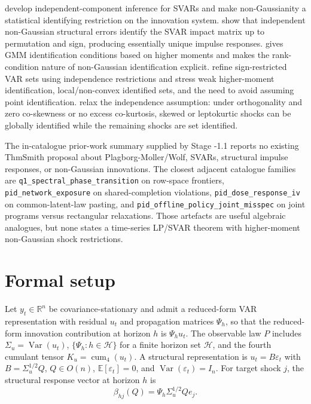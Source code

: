 \documentclass[11pt]{article}
\newcommand{\E}{\mathbb{E}}
\newcommand{\calH}{\mathcal{H}}
\newcommand{\R}{\mathbb{R}}
\theoremstyle{definition}
\theoremstyle{plain}
\theoremstyle{remark}
\begin{document}
\citet{GourierouxMonfortRenne2017} develop independent-component inference for SVARs and make non-Gaussianity a statistical identifying restriction on the innovation system.  \citet{LanneMeitzSaikkonen2017} show that independent non-Gaussian structural errors identify the SVAR impact matrix up to permutation and sign, producing essentially unique impulse responses.  \citet{Guay2021} gives GMM identification conditions based on higher moments and makes the rank-condition nature of non-Gaussian identification explicit.  \citet{DrautzburgWright2023} refine sign-restricted VAR sets using independence restrictions and stress weak higher-moment identification, local/non-convex identified sets, and the need to avoid assuming point identification.  \citet{LanneLiu2026} relax the independence assumption: under orthogonality and zero co-skewness or no excess co-kurtosis, skewed or leptokurtic shocks can be globally identified while the remaining shocks are set identified.

The in-catalogue prior-work summary supplied by Stage -1.1 reports no existing ThmSmith proposal about Plagborg-Moller/Wolf, SVARs, structural impulse responses, or non-Gaussian innovations.  The closest adjacent catalogue families are \texttt{q1\_spectral\_phase\_transition} on row-space frontiers, \texttt{pid\_network\_exposure} on shared-completion violations, \texttt{pid\_dose\_response\_iv} on common-latent-law pasting, and \texttt{pid\_offline\_policy\_joint\_misspec} on joint programs versus rectangular relaxations.  Those artefacts are useful algebraic analogues, but none states a time-series LP/SVAR theorem with higher-moment non-Gaussian shock restrictions.

\section{Formal setup}
Let $y_t\in\R^n$ be covariance-stationary and admit a reduced-form VAR representation with residual $u_t$ and propagation matrices $\Psi_h$, so that the reduced-form innovation contribution at horizon $h$ is $\Psi_h u_t$.  The observable law $P$ includes $\Sigma_u=\operatorname{Var}(u_t)$, $\{\Psi_h:h\in\calH\}$ for a finite horizon set $\calH$, and the fourth cumulant tensor $K_u=\operatorname{cum}_4(u_t)$.  A structural representation is $u_t=B\varepsilon_t$ with $B=\Sigma_u^{1/2}Q$, $Q\in O(n)$, $\E[\varepsilon_t]=0$, and $\operatorname{Var}(\varepsilon_t)=I_n$.  For target shock $j$, the structural response vector at horizon $h$ is
\[
  \beta_{hj}(Q)=\Psi_h \Sigma_u^{1/2}Qe_j .
\]
\end{document}
